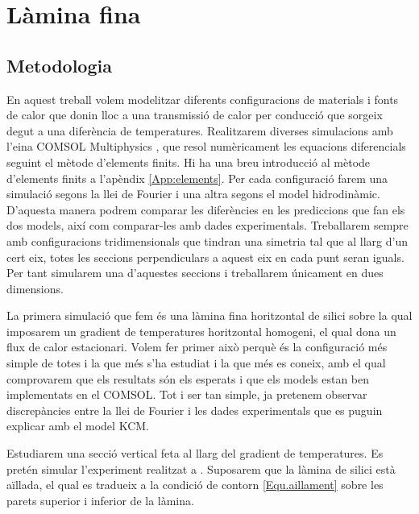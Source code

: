 \documentclass{article}
\begin{document}
\section{L\`{a}mina fina}

\subsection{Metodologia}

En aquest treball volem modelitzar diferents configuracions de materials i fonts de calor que donin lloc a una transmissi\'{o} de calor per conducci\'{o} que sorgeix degut a una difer\`{e}ncia de temperatures. Realitzarem diverses simulacions amb l'eina COMSOL Multiphysics \cite{COMSOL}, que resol num\`{e}ricament les equacions diferencials seguint el m\`{e}tode d'elements finits. Hi ha una breu introducci\'{o} al m\`{e}tode d'elements finits a l'ap\`{e}ndix \ref{App:elements}. Per cada configuraci\'{o} farem una simulaci\'{o} segons la llei de Fourier i una altra segons el model hidrodin\`{a}mic. D'aquesta manera podrem comparar les difer\`{e}ncies en les prediccions que fan els dos models, aix\'{i} com comparar-les amb dades experimentals. Treballarem sempre amb configuracions tridimensionals que tindran una simetria tal que al llarg d'un cert eix, totes les seccions perpendiculars a aquest eix en cada punt seran iguals. Per tant simularem una d'aquestes seccions i treballarem \'{u}nicament en dues dimensions.
\vspace{3mm}

La primera simulaci\'{o} que fem \'{e}s una l\`{a}mina fina horitzontal de silici sobre la qual imposarem un gradient de temperatures horitzontal homogeni, el qual dona un flux de calor estacionari. Volem fer primer aix\`{o} perqu\`{e} \'{e}s la configuraci\'{o} m\'{e}s simple de totes i la que m\'{e}s s'ha estudiat i la que m\'{e}s es coneix, amb el qual comprovarem que els resultats s\'{o}n els esperats i que els models estan ben implementats en el COMSOL. Tot i ser tan simple, ja pretenem observar discrep\`{a}ncies entre la llei de Fourier i les dades experimentals que es puguin explicar amb el model KCM.

Estudiarem una secci\'{o} vertical feta al llarg del gradient de temperatures. Es pret\'{e}n simular l'experiment realitzat a \cite{asheghi2002thermal}. Suposarem que la l\`{a}mina de silici est\`{a} a\"{i}llada, el qual es tradueix a la condici\'{o} de contorn \eqref{Equ.aillament} sobre les parets superior i inferior de la l\`{a}mina.
\end{document}
